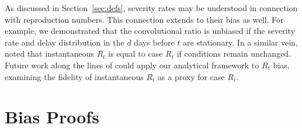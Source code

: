 \documentclass{article}
\renewcommand{\hat}{\widehat} %
\begin{document}
As discussed in Section~\ref{sec:defs}, severity rates may be understood in connection with reproduction numbers. This connection extends to their bias as well. For example, we  demonstrated that the convolutional ratio is unbiased if the severity rate and delay distribution in the $d$ days before $t$ are stationary. In a similar vein, \citet{fraser2007} noted that instantaneous $R_t$ is equal to case $R_t$ if conditions remain unchanged. 
Future work along the lines of \citet{rt_study} could apply our analytical framework to $R_t$ bias, examining the fidelity of instantaneous $R_t$ as a proxy for case $R_t$. 





\pagebreak
\appendix
\section{Bias Proofs}\label{apx:proofs}
\end{document}
